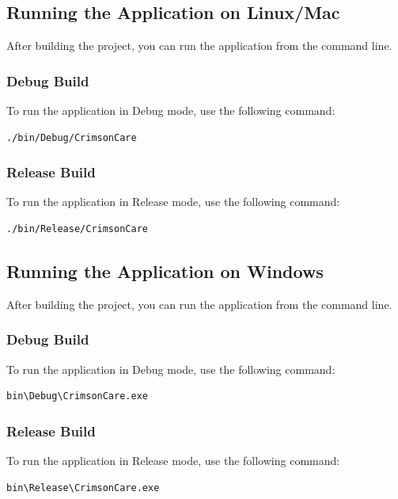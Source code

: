 \documentclass[12pt,a4paper]{report}
\begin{document}
\subsection{Running the Application on Linux/Mac}
After building the project, you can run the application from the command line.

\subsubsection{Debug Build}
To run the application in Debug mode, use the following command:
\begin{lstlisting}[language=Bash, caption=Running the Application: Debug Build on Linux/Mac]
./bin/Debug/CrimsonCare
\end{lstlisting}

\subsubsection{Release Build}
To run the application in Release mode, use the following command:
\begin{lstlisting}[language=Bash, caption=Running the Application: Release Build on Linux/Mac]
./bin/Release/CrimsonCare
\end{lstlisting}

\subsection{Running the Application on Windows}
After building the project, you can run the application from the command line.

\subsubsection{Debug Build}
To run the application in Debug mode, use the following command:
\begin{lstlisting}[language=Bash, caption=Running the Application: Debug Build on Windows]
bin\Debug\CrimsonCare.exe
\end{lstlisting}

\subsubsection{Release Build}
To run the application in Release mode, use the following command:
\begin{lstlisting}[language=Bash, caption=Running the Application: Release Build on Windows]
bin\Release\CrimsonCare.exe
\end{lstlisting}
\end{document}
